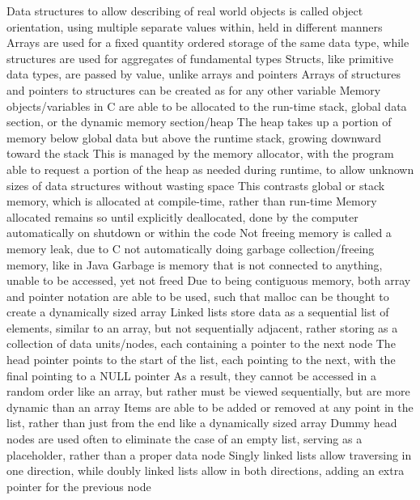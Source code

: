 \documentclass[11 pt, twoside]{article}
\newenvironment{outline*}
{
	\begin{outline}[enumerate]
	}
	{\end{outline}
}
\begin{document}
\begin{outline*}
\1 Data structures to allow describing of real world objects is called object orientation, using multiple separate values within, held in different manners
\2 Arrays are used for a fixed quantity ordered storage of the same data type, while structures are used for aggregates of fundamental types
\2 Structs, like primitive data types, are passed by value, unlike arrays and pointers
\1 Arrays of structures and pointers to structures can be created as for any other variable
\1 Memory objects/variables in C are able to be allocated to the run-time stack, global data section, or the dynamic memory section/heap
\2 The heap takes up a portion of memory below global data but above the runtime stack, growing downward toward the stack
\2 This is managed by the memory allocator, with the program able to request a portion of the heap as needed during runtime, to allow unknown sizes of data structures without wasting space
\3 This contrasts global or stack memory, which is allocated at compile-time, rather than run-time
\3 Memory allocated remains so until explicitly deallocated, done by the computer automatically on shutdown or within the code
\3 Not freeing memory is called a memory leak, due to C not automatically doing garbage collection/freeing memory, like in Java
\4 Garbage is memory that is not connected to anything, unable to be accessed, yet not freed
\2 Due to being contiguous memory, both array and pointer notation are able to be used, such that malloc can be thought to create a dynamically sized array
\1 Linked lists store data as a sequential list of elements, similar to an array, but not sequentially adjacent, rather storing as a collection of data units/nodes, each containing a pointer to the next node
\2 The head pointer points to the start of the list, each pointing to the next, with the final pointing to a NULL pointer
\2 As a result, they cannot be accessed in a random order like an array, but rather must be viewed sequentially, but are more dynamic than an array
\3 Items are able to be added or removed at any point in the list, rather than just from the end like a dynamically sized array
\2 Dummy head nodes are used often to eliminate the case of an empty list, serving as a placeholder, rather than a proper data node
\2 Singly linked lists allow traversing in one direction, while doubly linked lists allow in both directions, adding an extra pointer for the previous node
\end{outline*}
\end{document}
